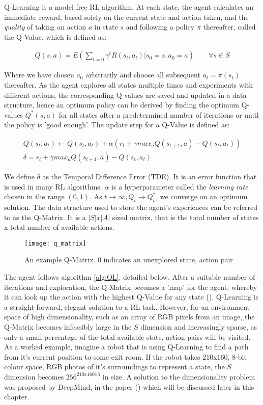 Q-Learning is a model free RL algorithm. At each state, the agent calculates an immediate reward,
based solely on the current state and action taken, and the \textit{quality} of taking an action $a$
in state $s$ and following a policy $\pi$ thereafter, called the Q-Value, which is defined as:

\begin{align}
    \label{equ:Q}
    Q(s, a) = E(\sum_{t=0}\gamma^tR(s_t, a_t) | s_0 = s, a_0 = a) \qquad \forall s \in S
\end{align}

Where we have chosen $a_0$ arbitrarily and
choose all subsequent $a_t = \pi(s_t)$ thereafter. As the agent explores all states multiple times
and experiments with different actions, the corresponding Q-values are saved and updated in a data
structure, hence an optimum policy can be derived by finding the optimum Q-values $Q^*(s, a)$ for all states after a predetermined number of iterations or until the policy is 'good enough'. The update step for a Q-Value is defined as:

\begin{gather}
    \label{equ:QUpdate}
    Q(s_t, a_t) \leftarrow Q(s_t, a_t) + \alpha(r_t + \gamma max_aQ(s_{t+1}, a) - Q(s_t, a_t)) \\
    \label{equ:TDE}
    \delta = r_t + \gamma max_aQ(s_{t+1}, a) - Q(s_t, a_t)
\end{gather}

We define $\delta$ as the Temporal Difference Error (TDE). It is an error function that is used in many RL algorithms. $\alpha$ is a hyperparameter called the \textit{learning rate} chosen in the range $(0, 1)$. As $t \rightarrow \infty, Q_t \rightarrow Q^*_t$, we converge on an optimum solution. The data structure used to store the agent's experiences can be referred to as the Q-Matrix. It is a $|S| x |A|$ sized matrix, that is the total number of states x total number of available actions.

\begin{figure}[h]
    \texttt{[image: q\_matrix]}
    \centering
    \caption{An example Q-Matrix. 0 indicates an unexplored state, action pair}
\end{figure}

The agent follows algorithm \ref{alg:QL}, detailed below.
After a suitable number of iterations and exploration, the Q-Matrix becomes a 'map' for the agent,
whereby it can look up the action with the highest Q-Value for any state (\citet{qlearning}).
Q-Learning is a straight-forward, elegant solution to a RL task. However, for an environment space
of high dimensionality, such as an array of RGB pixels from an image, the Q-Matrix becomes
infeasibly large in the $S$ dimension and increasingly sparse, as only a small percentage of the
total available state, action pairs will be visited. As a worked example, imagine a robot that is
using Q-Learning to find a path from it's current position to some exit room. If the robot takes
210x160, 8-bit colour space, RGB photos of it's surroundings to represent a state, the $S$ dimension
becomes $256^{210x160x3}$ in size. A solution to the dimensionality problem was
proposed by DeepMind, in the paper (\citet{deepmind1}) which will be discussed later in this chapter.

